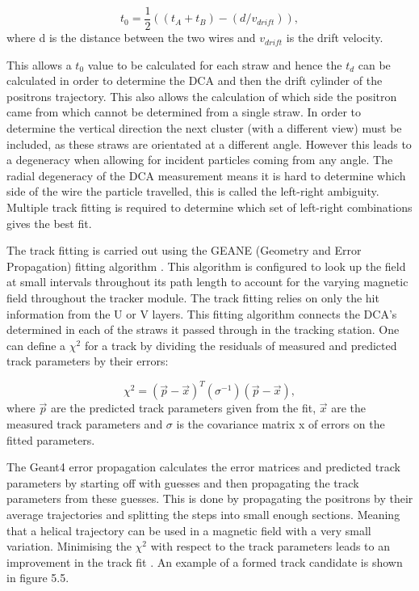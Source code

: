\begin{equation}
t_{0} = \frac{1}{2}((t_{A} + t_{B})-(d/v_{drift})),
\end{equation}
where d is the distance between the two wires and $v_{drift}$ is the drift velocity.

This allows a $t_{0}$ value to be calculated for each straw and hence the $t_{d}$ can be calculated in order to determine the DCA and then the drift cylinder of the positrons trajectory. This also allows the calculation of which side the positron came from which cannot be determined from a single straw. In order to determine the vertical direction the next cluster (with a different view) must be included, as these straws are orientated at a different angle. However this leads to a degeneracy when allowing for incident particles coming from any angle. The radial degeneracy of the DCA measurement means it is hard to determine which side of the wire the particle travelled, this is called the left-right ambiguity. Multiple track fitting is required to determine which set of left-right combinations gives the best fit. 

The track fitting is carried out using the GEANE (Geometry and Error Propagation) fitting algorithm \cite{geane}. This algorithm is configured to look up the field at small intervals throughout its path length to account for the varying magnetic field throughout the tracker module. The track fitting relies on only the hit information from the U or V layers. This fitting algorithm connects the DCA's determined in each of the straws it passed through in the tracking station. One can define a $\chi^{2}$ for a track by dividing the residuals of measured and predicted track parameters by their errors:

\begin{equation}
\chi^{2}= (\vec{p}-\vec{x})^{T}(\sigma^{-1})(\vec{p}-\vec{x}),
\end{equation}
\noindent
where $\vec{p}$ are the predicted track parameters given from the fit, $\vec{x}$ are the measured track parameters and $\sigma$ is the covariance matrix x of errors on the fitted parameters.

The Geant4 error propagation calculates the error matrices and predicted track parameters by starting off with guesses and then propagating the track parameters from these guesses. This is done by propagating the positrons by their average trajectories and splitting the steps into small enough sections. Meaning that a helical trajectory can be used in a magnetic field with a very small variation. Minimising the $\chi^{2}$ with respect to the track parameters leads to an improvement in the track fit \cite{geanefitting}. An example of a formed track candidate is shown in figure 5.5.

